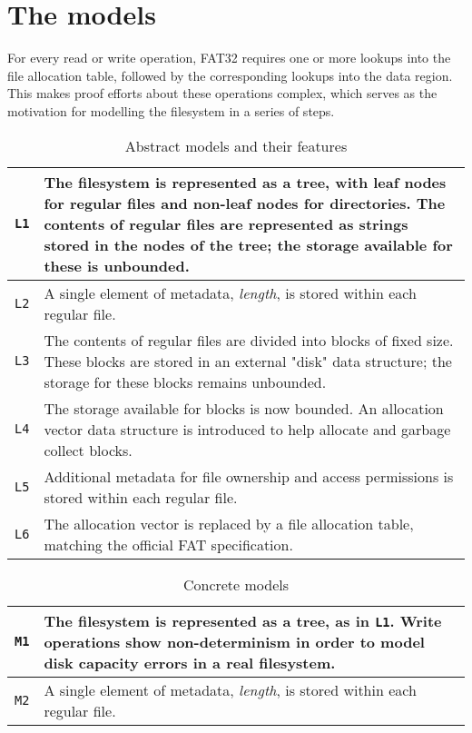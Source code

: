 \documentclass[submission,copyright,creativecommons]{eptcs}
\begin{document}
\section{The models}

For every read or write operation, FAT32 requires one or more lookups
into the file allocation table, followed by the corresponding lookups
into the data region. This makes proof efforts about these operations
complex, which serves as the motivation for modelling the filesystem
in a series of steps.

\begin{table}[]
  \centering
  \caption{Abstract models and their features}
  \label{abstract-model-description-table}
  \begin{tabular}{|l|p{120mm}|}
    \hline
    \texttt{L1} & The filesystem is represented as a tree, with leaf
    nodes for regular files and non-leaf nodes for
    directories. The contents of regular files are represented as
    strings stored in the nodes of the tree; the storage available for
    these is unbounded. \\ \hline
    \texttt{L2} & A single element of metadata, \textit{length}, is
    stored within each regular file.  \\ \hline
    \texttt{L3} & The contents of regular files are divided into
    blocks of fixed size. These blocks are stored in an external
    "disk" data structure; the storage for these blocks remains
    unbounded. \\ \hline
    \texttt{L4} & The storage available for blocks is now bounded. An
    allocation vector data structure is introduced to help allocate
    and garbage collect blocks. \\ \hline
    \texttt{L5} & Additional metadata for file ownership and access
    permissions is stored within each regular file. \\ \hline
    \texttt{L6} & The allocation vector is replaced by a file
    allocation table, matching the official FAT specification. \\ \hline
  \end{tabular}
\end{table}

\begin{table}[]
  \centering
  \caption{Concrete models}
  \label{concrete-model-description-table}
  \begin{tabular}{|l|p{120mm}|}
    \hline
    \texttt{M1} & The filesystem is represented as a tree, as in
    \texttt{L1}. Write operations show non-determinism in order to
    model disk capacity errors in a real filesystem. \\ \hline
    \texttt{M2} & A single element of metadata, \textit{length}, is
    stored within each regular file.  \\ \hline
  \end{tabular}
\end{table}
\end{document}
